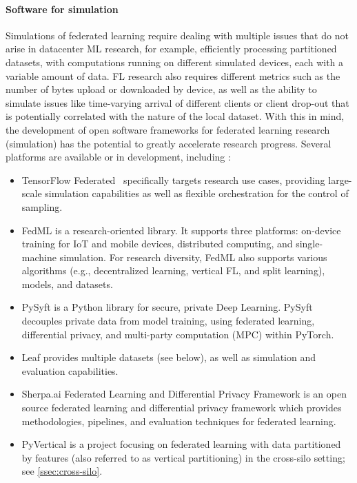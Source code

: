 \documentclass[11pt]{article}
\begin{document}
\paragraph{Software for simulation} Simulations of federated learning require dealing with multiple issues that do not arise in datacenter ML research, for example, efficiently processing partitioned datasets, with computations running on different simulated devices, each with a variable amount of data. FL research also requires different metrics such as the number of bytes upload or downloaded by device, as well as the ability to simulate issues like time-varying arrival of different clients or client drop-out that is potentially correlated with the nature of the local dataset. With this in mind, the development of open software frameworks for federated learning research (simulation) has the potential to greatly accelerate research progress. Several platforms are available or in development, including \cite{sathya2018review}:
\begin{itemize}
    \item TensorFlow Federated~\citep{tff} specifically targets research use cases, providing large-scale simulation capabilities as well as flexible orchestration for the control of sampling.  
    \item FedML \citep{he2020fedml} is a research-oriented library. It supports three platforms: on-device training for IoT and mobile devices, distributed computing, and single-machine simulation. For research diversity, FedML also supports various algorithms (e.g., decentralized learning, vertical FL, and split learning), models, and datasets.
    \item PySyft \citep{PySyft}  is a Python library for secure, private Deep Learning. PySyft decouples private data from model training, using federated learning, differential privacy, and multi-party computation (MPC) within PyTorch.  
    \item Leaf \citep{Leaf} provides multiple datasets (see below), as well as simulation and evaluation capabilities.
    \item Sherpa.ai Federated Learning and Differential Privacy Framework \citep{rodriguez2020federated} is an open source federated learning and differential privacy framework which provides methodologies, pipelines, and evaluation techniques for federated learning.
    \item PyVertical \citep{PyVertical} is a project focusing on federated learning with data partitioned by features (also referred to as vertical partitioning) in the cross-silo setting; see \cref{ssec:cross-silo}.
\end{itemize}
\end{document}
